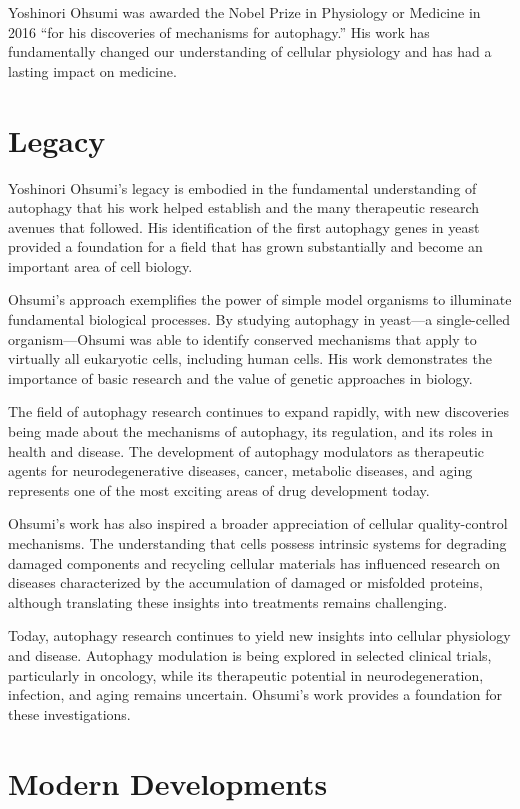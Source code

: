 Yoshinori Ohsumi was awarded the Nobel Prize in Physiology or Medicine in 2016 ``for his discoveries of mechanisms for autophagy.'' His work has fundamentally changed our understanding of cellular physiology and has had a lasting impact on medicine.

\section{Legacy}

Yoshinori Ohsumi's legacy is embodied in the fundamental understanding of autophagy that his work helped establish and the many therapeutic research avenues that followed. His identification of the first autophagy genes in yeast provided a foundation for a field that has grown substantially and become an important area of cell biology.

Ohsumi's approach exemplifies the power of simple model organisms to illuminate fundamental biological processes. By studying autophagy in yeast---a single-celled organism---Ohsumi was able to identify conserved mechanisms that apply to virtually all eukaryotic cells, including human cells. His work demonstrates the importance of basic research and the value of genetic approaches in biology.

The field of autophagy research continues to expand rapidly, with new discoveries being made about the mechanisms of autophagy, its regulation, and its roles in health and disease. The development of autophagy modulators as therapeutic agents for neurodegenerative diseases, cancer, metabolic diseases, and aging represents one of the most exciting areas of drug development today.

Ohsumi's work has also inspired a broader appreciation of cellular quality-control mechanisms. The understanding that cells possess intrinsic systems for degrading damaged components and recycling cellular materials has influenced research on diseases characterized by the accumulation of damaged or misfolded proteins, although translating these insights into treatments remains challenging.

Today, autophagy research continues to yield new insights into cellular physiology and disease. Autophagy modulation is being explored in selected clinical trials, particularly in oncology, while its therapeutic potential in neurodegeneration, infection, and aging remains uncertain. Ohsumi's work provides a foundation for these investigations.


\section{Modern Developments}

